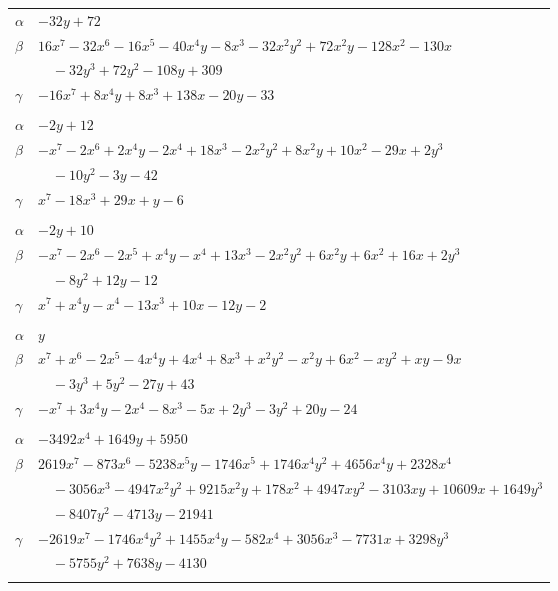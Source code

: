 \documentclass[11pt]{article}
\begin{document}
\begin{longtable}{@{}ll@{}}
$\alpha$ & $-32y+72$\\
$\beta$ & $16x^{7}-32x^{6}-16x^{5}-40x^{4}y-8x^{3}-32x^{2}y^{2}+72x^{2}y-128x^{2}-130x$\\
 & $\quad -32y^{3}+72y^{2}-108y+309$\\
$\gamma$ & $-16x^{7}+8x^{4}y+8x^{3}+138x-20y-33$\\
\addlinespace[3pt]
\multicolumn{2}{@{}l}{$\{i,j\}=\{15,27\}$, $k_{ij}=2^{2}\cdot 3\cdot 5$}\\
$\alpha$ & $-2y+12$\\
$\beta$ & $-x^{7}-2x^{6}+2x^{4}y-2x^{4}+18x^{3}-2x^{2}y^{2}+8x^{2}y+10x^{2}-29x+2y^{3}$\\
 & $\quad -10y^{2}-3y-42$\\
$\gamma$ & $x^{7}-18x^{3}+29x+y-6$\\
\addlinespace[3pt]
\multicolumn{2}{@{}l}{$\{i,j\}=\{15,28\}$, $k_{ij}=2^{2}\cdot 5$}\\
$\alpha$ & $-2y+10$\\
$\beta$ & $-x^{7}-2x^{6}-2x^{5}+x^{4}y-x^{4}+13x^{3}-2x^{2}y^{2}+6x^{2}y+6x^{2}+16x+2y^{3}$\\
 & $\quad -8y^{2}+12y-12$\\
$\gamma$ & $x^{7}+x^{4}y-x^{4}-13x^{3}+10x-12y-2$\\
\addlinespace[3pt]
\multicolumn{2}{@{}l}{$\{i,j\}=\{16,27\}$, $k_{ij}=2^{3}\cdot 3$}\\
$\alpha$ & $y$\\
$\beta$ & $x^{7}+x^{6}-2x^{5}-4x^{4}y+4x^{4}+8x^{3}+x^{2}y^{2}-x^{2}y+6x^{2}-xy^{2}+xy-9x$\\
 & $\quad -3y^{3}+5y^{2}-27y+43$\\
$\gamma$ & $-x^{7}+3x^{4}y-2x^{4}-8x^{3}-5x+2y^{3}-3y^{2}+20y-24$\\
\addlinespace[3pt]
\multicolumn{2}{@{}l}{$\{i,j\}=\{16,29\}$, $k_{ij}=2^{5}\cdot 3^{2}\cdot 5\cdot 7$}\\
$\alpha$ & $-3492x^{4}+1649y+5950$\\
$\beta$ & $2619x^{7}-873x^{6}-5238x^{5}y-1746x^{5}+1746x^{4}y^{2}+4656x^{4}y+2328x^{4}$\\
 & $\quad -3056x^{3}-4947x^{2}y^{2}+9215x^{2}y+178x^{2}+4947xy^{2}-3103xy+10609x+1649y^{3}$\\
 & $\quad -8407y^{2}-4713y-21941$\\
$\gamma$ & $-2619x^{7}-1746x^{4}y^{2}+1455x^{4}y-582x^{4}+3056x^{3}-7731x+3298y^{3}$\\
 & $\quad -5755y^{2}+7638y-4130$\\
\addlinespace[3pt]

\end{longtable}
\end{document}
